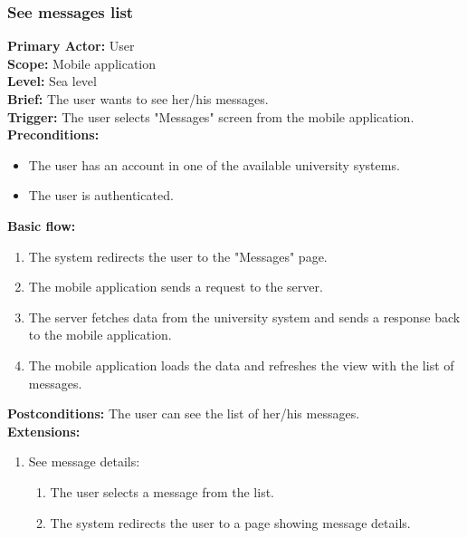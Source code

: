 \subsubsection{\large{See messages list}}
\textbf{Primary Actor:} User\\
\textbf{Scope:} Mobile application\\
\textbf{Level:} Sea level\\
\textbf{Brief:} The user wants to see her/his messages.\\
\textbf{Trigger:} The user selects "Messages" screen from the mobile application.\\
\textbf{Preconditions:}
\begin{itemize}
    \item The user has an account in one of the available university systems.
    \item The user is authenticated.
\end{itemize}
\textbf{Basic flow:}
\begin{enumerate}
    \item The system redirects the user to the "Messages" page.
    \item The mobile application sends a request to the server.
    \item The server fetches data from the university system and sends a response back to the mobile application.
    \item The mobile application loads the data and refreshes the view with the list of messages.
\end{enumerate}
\textbf{Postconditions:}
The user can see the list of her/his messages.\\
\textbf{Extensions:}
\begin{enumerate}[label=\alph*.]
    \item See message details:
    \begin{enumerate}
        \item The user selects a message from the list.
        \item The system redirects the user to a page showing message details.
    \end{enumerate}
\end{enumerate}


